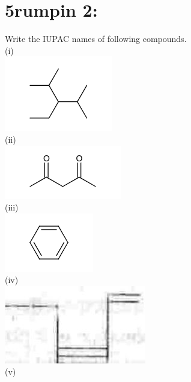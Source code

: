 \documentclass[10pt]{article}
\begin{document}
\section*{5rumpin 2:}
Write the IUPAC names of following compounds.\\
(i)\\
\includegraphics{smile-c47e8231670e23d9c9b43707d508ff3767990b46}\\
(ii)\\
\includegraphics{smile-87fcbc3cf6c2d82281cafafd257c78381d237ccb}\\
(iii)\\
\includegraphics{smile-310334993e1043a663b784ac4293ca0431b9d7cb}\\
(iv)\\
\includegraphics[max width=\textwidth, center]{2025_01_28_8470952b98110cec3aabg-114(1)}\\
(v)\\
\end{document}
